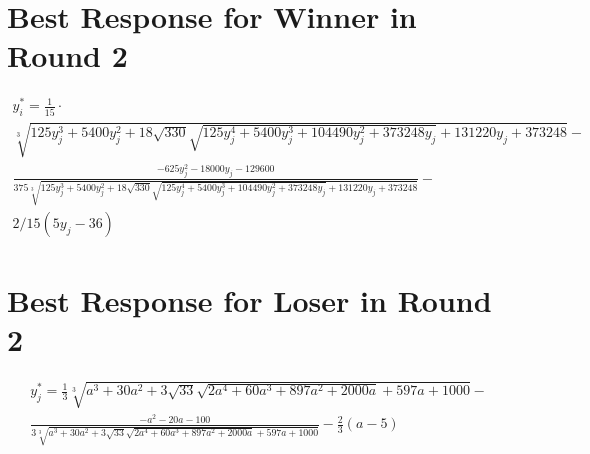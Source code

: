 \begin{appendices}
\section{Best Response for Winner in Round 2}

\begin{multline*}
y_i^* = \frac{1}{15}\cdot\\ \sqrt[3]{125 y_j^3 + 5400 y_j^2 + 18 \sqrt{330} \sqrt{125 y_j^4 + 5400 y_j^3 + 104490 y_j^2 + 373248 y_j} + 131220 y_j + 373248} - \\
\frac{-625 y_j^2 - 18000 y_j - 129600}{375 \sqrt[3]{125 y_j^3 + 5400 y_j^2 + 18 \sqrt{330} \sqrt{125 y_j^4 + 5400 y_j^3 + 104490 y_j^2 + 373248 y_j} + 131220 y_j + 373248}} - \\
2/15 (5 y_j - 36)
\end{multline*}

\section{Best Response for Loser in Round 2}

\begin{multline*}
y_j^* = \frac{1}{3} \sqrt[3]{a^3 + 30 a^2 + 3 \sqrt{33} \sqrt{2 a^4 + 60 a^3 + 897 a^2 + 2000 a} + 597 a + 1000}-\\
\frac{-a^2 - 20 a - 100}{3 \sqrt[3]{a^3 + 30 a^2 + 3 \sqrt{33} \sqrt{2 a^4 + 60 a^3 + 897 a^2 + 2000 a} + 597 a + 1000}} - \frac{2}{3} (a - 5)
\end{multline*}

\end{appendices}